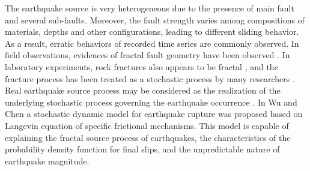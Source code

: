 \documentclass[%
 aip,
rsi,%
 amsmath,amssymb,
 reprint,%
]{revtex4-1}
\begin{document}
The earthquake source is very heterogeneous due to the presence of main fault and several sub-faults. Moreover, the fault strength varies among compositions of materials, depths and other configurations, leading to different sliding behavior.
As a result, erratic behaviors of recorded time series are commonly observed. In field observations, evidences of fractal fault geometry have been observed \cite{aviles_fractal_1987,hirata_fractal_1989,sunmonu_fractal_2000}. In laboratory experiments, rock fractures also appears to be fractal \cite{velde_fractal_1991,babadagli_fractal_2003,xu_fractal_2016}, and the fracture process has been treated as a stochastic process by many researchers \cite{otsuka_chain-reaction-type_1972,vere-jones_branching_1976,watanabe_stochastic_1986}. Real earthquake source process may be considered as the realization of the underlying stochastic process governing the earthquake occurrence \cite{vere-jones_branching_1976,kagan_stochastic_1982,zhuang_stochastic_2015}.
In Wu and Chen \cite{wu_stochastic_2018} a stochastic dynamic model for earthquake rupture was proposed based on Langevin equation of specific frictional mechanisms. This model is capable of explaining the fractal source process of earthquakes, the characteristics of the probability density function for final slips, and the unpredictable nature of earthquake magnitude.
\end{document}
